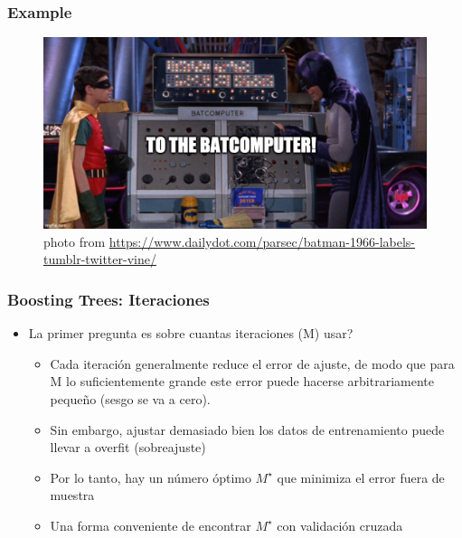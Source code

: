 \documentclass[
  shownotes,
  xcolor={svgnames},
  hyperref={colorlinks,citecolor=DarkBlue,linkcolor=andesred,urlcolor=DarkBlue}
  , aspectratio=169]{beamer}
\begin{document}
\begin{frame}[fragile]
\frametitle{Example}
\begin{figure}[H] \centering
  \centering
  \includegraphics[scale=0.35]{figures/baticomputer_meme.jpg}
  \\
  \tiny photo from \url{https://www.dailydot.com/parsec/batman-1966-labels-tumblr-twitter-vine/}
\end{figure}
\end{frame}
\begin{frame}[fragile]
\frametitle{Boosting Trees: Iteraciones}

\begin{itemize}

\item La primer pregunta es sobre cuantas iteraciones (M) usar?
\begin{itemize}
\medskip
  
  \item Cada iteración generalmente reduce el error de ajuste, de modo que para M lo suficientemente grande este error puede hacerse arbitrariamente pequeño (sesgo se va a cero).
  \medskip
  \item Sin embargo, ajustar demasiado bien los datos de entrenamiento puede llevar a overfit (sobreajuste)
  \medskip
  \item Por lo tanto, hay un número óptimo $ M^\star$ que minimiza el error fuera de muestra
  \medskip
  \item Una forma conveniente de encontrar $M^\star$ con validación cruzada

  \end{itemize}
\end{itemize}

\end{frame}
\end{document}
